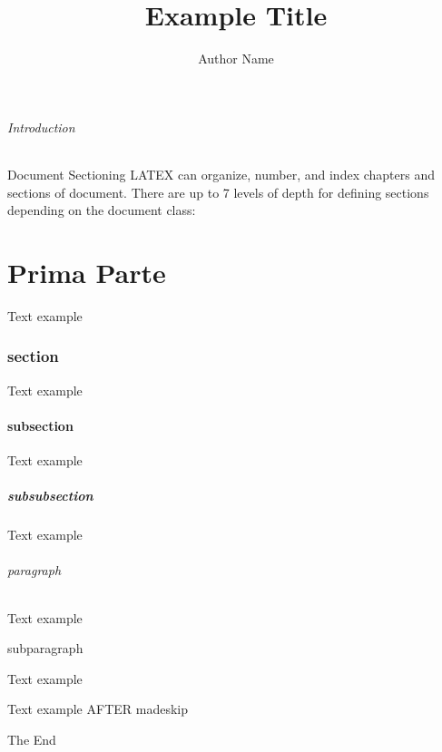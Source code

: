 \documentclass{article}
\title{Example Title}
\author{Author Name}
\begin{document}
\maketitle

\paragraph{Introduction}
Document Sectioning
LATEX can organize, number, and index chapters and sections of document. There are up to 7 levels of depth for defining sections depending on the document class:

\newpage
\part{Prima Parte}
Text example

\section{section}
Text example

\subsection{subsection}
Text example

\subsubsection{subsubsection}
Text example

\paragraph{paragraph}
Text example

\subparagraph{subparagraph}
Text example

\medskip
Text example AFTER madeskip

\newpage 
The End
\end{document}

